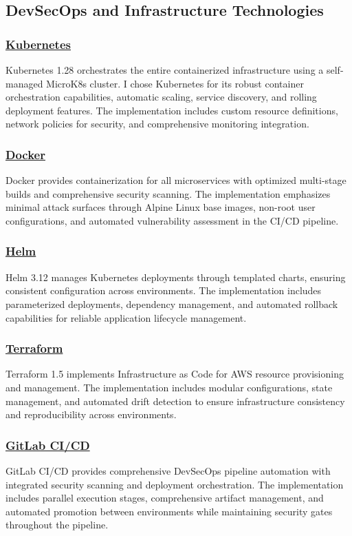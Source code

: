 \subsection{DevSecOps and Infrastructure Technologies}

\subsubsection*{\underline{Kubernetes}}
Kubernetes 1.28 orchestrates the entire containerized infrastructure using a self-managed MicroK8s cluster. I chose Kubernetes for its robust container orchestration capabilities, automatic scaling, service discovery, and rolling deployment features. The implementation includes custom resource definitions, network policies for security, and comprehensive monitoring integration.

\subsubsection*{\underline{Docker}}
Docker provides containerization for all microservices with optimized multi-stage builds and comprehensive security scanning. The implementation emphasizes minimal attack surfaces through Alpine Linux base images, non-root user configurations, and automated vulnerability assessment in the CI/CD pipeline.

\subsubsection*{\underline{Helm}}
Helm 3.12 manages Kubernetes deployments through templated charts, ensuring consistent configuration across environments. The implementation includes parameterized deployments, dependency management, and automated rollback capabilities for reliable application lifecycle management.

\subsubsection*{\underline{Terraform}}
Terraform 1.5 implements Infrastructure as Code for AWS resource provisioning and management. The implementation includes modular configurations, state management, and automated drift detection to ensure infrastructure consistency and reproducibility across environments.

\subsubsection*{\underline{GitLab CI/CD}}
GitLab CI/CD provides comprehensive DevSecOps pipeline automation with integrated security scanning and deployment orchestration. The implementation includes parallel execution stages, comprehensive artifact management, and automated promotion between environments while maintaining security gates throughout the pipeline.

